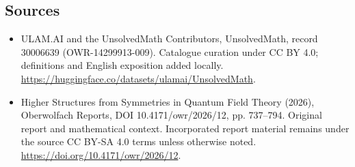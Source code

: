 \documentclass[11pt]{article}
\begin{document}
\subsection{Sources}
\begin{itemize}
\item[\hypertarget{source:30006639:1}{S1}] ULAM.AI and the UnsolvedMath Contributors, UnsolvedMath, record 30006639 (OWR-14299913-009). Catalogue curation under CC BY 4.0; definitions and English exposition added locally.
\url{https://huggingface.co/datasets/ulamai/UnsolvedMath}.
\item[\hypertarget{source:30006639:2}{S2}] Higher Structures from Symmetries in Quantum Field Theory (2026), Oberwolfach Reports, DOI 10.4171/owr/2026/12, pp. 737--794. Original report and mathematical context. Incorporated report material remains under the source CC BY-SA 4.0 terms unless otherwise noted.
\url{https://doi.org/10.4171/owr/2026/12}.
\end{itemize}
\label{end:30006639}
\end{document}
